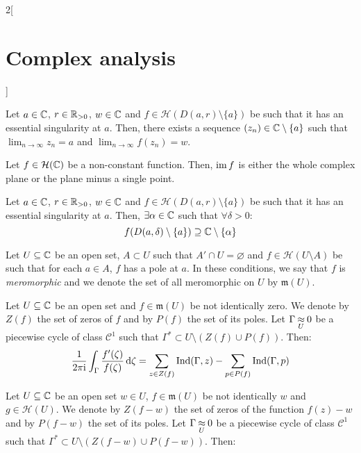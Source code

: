 \documentclass[../../../main_math.tex]{subfiles}
\begin{document}
\begin{multicols}{2}[\section{Complex analysis}]
\begin{theorem}
  \end{theorem}
  \begin{corollary}
    Let $a\in\mathbb{C}$, $r\in\mathbb{R}_{>0}$, $w\in\mathbb{C}$ and $f\in\mathcal{H}(D(a,r)\setminus\{a\})$ be such that it has an essential singularity at $a$. Then, there exists a sequence $(z_n)\in\mathbb{C}\setminus\{a\}$ such that $\displaystyle\lim_{n\to\infty}z_n=a$ and $\displaystyle\lim_{n\to\infty}f(z_n)=w$.
  \end{corollary}
  \begin{theorem}
    Let $f\in\mathcal{H}(\mathbb{C})$ be a non-constant function. Then, $\operatorname{im} f$ is either the whole complex plane or the plane minus a single point.
  \end{theorem}
  \begin{theorem}
    Let $a\in\mathbb{C}$, $r\in\mathbb{R}_{>0}$, $w\in\mathbb{C}$ and $f\in\mathcal{H}(D(a,r)\setminus\{a\})$ be such that it has an essential singularity at $a$. Then, $\exists\alpha\in\mathbb{C}$ such that $\forall \delta>0$: $$f(D(a,\delta)\setminus\{a\})\supseteq\mathbb{C}\setminus\{\alpha\}$$
  \end{theorem}
  \begin{definition}
    Let $U\subseteq \mathbb{C}$ be an open set, $A\subset U$ such that $A'\cap U=\varnothing$ and $f\in\mathcal{H}(U\setminus A)$ be such that for each $a\in A$, $f$ has a pole at $a$. In these conditions, we say that $f$ is \emph{meromorphic} and we denote the set of all meromorphic on $U$ by $\mathfrak{m}(U)$.
  \end{definition}
  \begin{theorem}
    Let $U\subseteq \mathbb{C}$ be an open set and $f\in\mathfrak{m}(U)$ be not identically zero. We denote by $Z(f)$ the set of zeros of $f$ and by $P(f)$ the set of its poles. Let $\Gamma\mathbin{\underset{U}{\approx}} 0$ be a piecewise cycle of class $\mathcal{C}^1$ such that $\Gamma^*\subset U\setminus (Z(f)\cup P(f))$. Then:
    $$\frac{1}{2\pi\mathrm{i}}\int_{\Gamma}\frac{f'(\zeta)}{f(\zeta)}\dd{\zeta}=\sum_{z\in Z(f)}\operatorname{Ind}(\Gamma,z)-\sum_{p\in P(f)}\operatorname{Ind}(\Gamma,p)$$
  \end{theorem}
  \begin{theorem}
    Let $U\subseteq \mathbb{C}$ be an open set $w\in U$, $f\in\mathfrak{m}(U)$ be not identically $w$ and $g\in\mathcal{H}(U)$. We denote by $Z(f-w)$ the set of zeros of the function $f(z)-w$ and by $P(f-w)$ the set of its poles. Let $\Gamma\mathbin{\underset{U}{\approx}} 0$ be a piecewise cycle of class $\mathcal{C}^1$ such that $\Gamma^*\subset U\setminus (Z(f-w)\cup P(f-w))$. Then:

\end{theorem}
\end{multicols}
\end{document}
